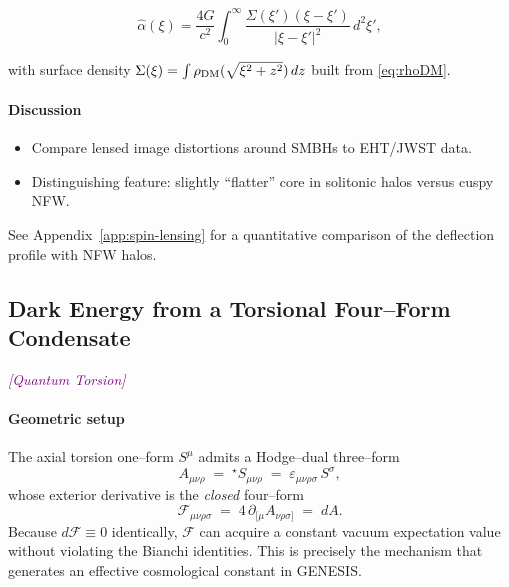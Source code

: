 \documentclass{article}
\newcommand{\quantumtag}{\textcolor{purple}{\textit{[Quantum Torsion]}}}
\begin{document}
\begin{equation}
  \hat\alpha(\xi)
    = \frac{4G}{c^2}\int_0^\infty
      \frac{\Sigma(\xi')(\xi - \xi')}{|\xi-\xi'|^2}\,d^2\xi',
\end{equation}

with surface density $\Sigma(\xi)=\int\rho_{\rm DM}(\sqrt{\xi^2+z^2})\,dz$ built from \eqref{eq:rhoDM}.

\paragraph{Discussion}
\begin{itemize}
  \item Compare lensed image distortions around SMBHs to EHT/JWST data.  
  \item Distinguishing feature: slightly “flatter” core in solitonic halos versus cuspy NFW.  
\end{itemize}

\vspace{1ex}
\hrulefill

See Appendix~\ref{app:spin-lensing} for a quantitative comparison of the deflection profile with NFW halos.

\medskip
\begin{center}
\end{center}
\medskip

\subsection{Dark Energy from a Torsional Four--Form Condensate}
\label{sec:DE}
\quantumtag


\paragraph{Geometric setup}
The axial torsion one--form $S^\mu$ admits a Hodge--dual three--form
\begin{equation}
  A_{\mu\nu\rho}\;=\;{}^{\star}\!S_{\mu\nu\rho}
  \;=\;\varepsilon_{\mu\nu\rho\sigma}\,S^{\sigma},
\end{equation}
whose exterior derivative is the \emph{closed} four--form
\begin{equation}\label{eq:Fdef}
  \mathcal F_{\mu\nu\rho\sigma}\;=\;4\,\partial_{[\mu}A_{\nu\rho\sigma]}
  \;=\;dA .
\end{equation}
Because $d\mathcal F\equiv0$ identically, $\mathcal F$ can acquire a constant
vacuum expectation value without violating the Bianchi identities.  This is
precisely the mechanism that generates an effective cosmological constant in
GENESIS.
\end{document}
